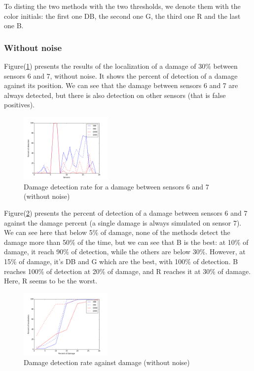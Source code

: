 \documentclass[journal]{IEEEtran}
\begin{document}
To disting the two methods with the two thresholds, we denote them with the color initials: the first one DB, the second one G, the third one R and the last one B.

\subsubsection{Without noise}

Figure(\ref{damage30}) presents the results of the localization of a damage of 30\% between sensors 6 and 7, without noise.
It shows the percent of detection of a damage against its position.
We can see that the damage between sensors 6 and 7 are always detected, but there is also detection on other sensors (that is false positives).

\begin{figure}[h!]
  \centering
  \includegraphics[width=0.4\textwidth]{images/damage30percent.png}
  \caption{Damage detection rate for a damage between sensors 6 and 7 (without noise)}
  \label{damage30}
\end{figure}


Figure(\ref{detect}) presents the percent of detection of a damage between sensors 6 and 7 against the damage percent (a single damage is always simulated on sensor 7). We can see here that below 5\% of damage, none of the methods detect the damage more than 50\% of the time, but we can see that B is the best: at 10\% of damage, it reach 90\% of detection, while the others are below 30\%. However, at 15\% of damage, it's DB and G which are the best, with 100\% of detection. B reaches 100\% of detection at 20\% of damage, and R reaches it at 30\% of damage. Here, R seems to be the worst.

\begin{figure}[h!]
  \centering
  \includegraphics[width=0.4\textwidth]{images/detect.png}
  \caption{Damage detection rate against damage (without noise)}
  \label{detect}
\end{figure}
\end{document}
